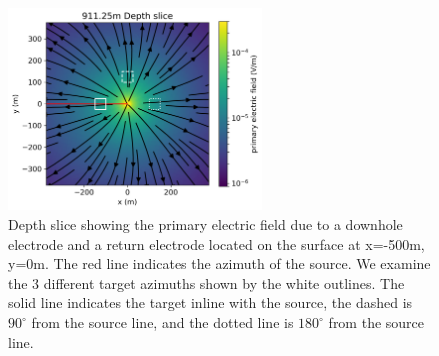 \begin{figure}
    \begin{center}
    \includegraphics[width=0.6\textwidth]{figures/primary_3D.png}
    \end{center}
\caption{
    Depth slice showing the primary electric field due to a downhole
    electrode and a return electrode located on the surface at x=-500m, y=0m. The red line indicates the
    azimuth of the source.
    We examine the 3 different target azimuths shown by the white outlines.
    The solid line indicates the target inline with the source,
    the dashed is $90^\circ$ from the source line, and the dotted line is $180^\circ$ from the source line.
}
\label{fig:primary_3D}
\end{figure}
